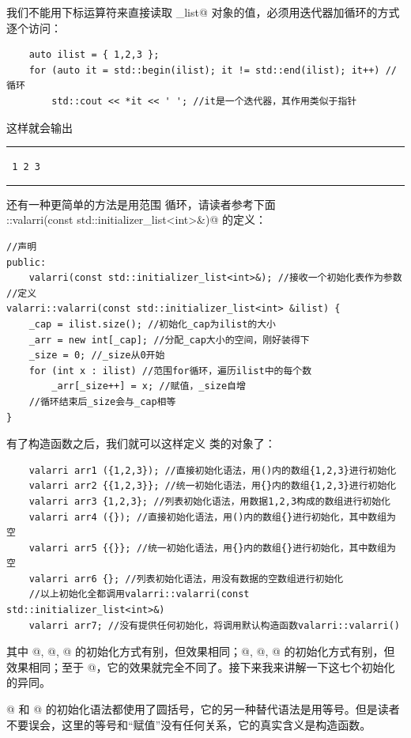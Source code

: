 我们不能用下标运算符来直接读取 \lstinline@initializer_list@ 对象的值，必须用迭代器加循环的方式逐个访问：
\begin{lstlisting}
    auto ilist = { 1,2,3 };
    for (auto it = std::begin(ilist); it != std::end(ilist); it++) //循环
        std::cout << *it << ' '; //it是一个迭代器，其作用类似于指针
\end{lstlisting}
这样就会输出\\\noindent\rule{\linewidth}{.2pt}\texttt{
1 2 3 
}\\\noindent\rule{\linewidth}{.2pt}\par
还有一种更简单的方法是用范围 \lstinline@for@ 循环，请读者参考下面\\\lstinline@valarri::valarri(const std::initializer_list<int>&)@ 的定义：
\begin{lstlisting}
//声明
public:
    valarri(const std::initializer_list<int>&); //接收一个初始化表作为参数
//定义
valarri::valarri(const std::initializer_list<int> &ilist) {
    _cap = ilist.size(); //初始化_cap为ilist的大小
    _arr = new int[_cap]; //分配_cap大小的空间，刚好装得下
    _size = 0; //_size从0开始
    for (int x : ilist) //范围for循环，遍历ilist中的每个数
        _arr[_size++] = x; //赋值，_size自增
    //循环结束后_size会与_cap相等
}
\end{lstlisting}\par
有了构造函数之后，我们就可以这样定义 \lstinline@valarri@ 类的对象了：
\begin{lstlisting}
    valarri arr1 ({1,2,3}); //直接初始化语法，用()内的数组{1,2,3}进行初始化
    valarri arr2 {{1,2,3}}; //统一初始化语法，用{}内的数组{1,2,3}进行初始化
    valarri arr3 {1,2,3}; //列表初始化语法，用数据1,2,3构成的数组进行初始化
    valarri arr4 ({}); //直接初始化语法，用()内的数组{}进行初始化，其中数组为空
    valarri arr5 {{}}; //统一初始化语法，用{}内的数组{}进行初始化，其中数组为空
    valarri arr6 {}; //列表初始化语法，用没有数据的空数组进行初始化
    //以上初始化全都调用valarri::valarri(const std::initializer_list<int>&)
    valarri arr7; //没有提供任何初始化，将调用默认构造函数valarri::valarri()
\end{lstlisting}
其中 @, @, @ 的初始化方式有别，但效果相同；@, @, @ 的初始化方式有别，但效果相同；至于 @，它的效果就完全不同了。接下来我来讲解一下这七个初始化的异同。\par
{}@ 和 @ 的初始化语法都使用了圆括号，它的另一种替代语法是用等号。但是读者不要误会，这里的等号和``赋值''没有任何关系，它的真实含义是构造函数。
